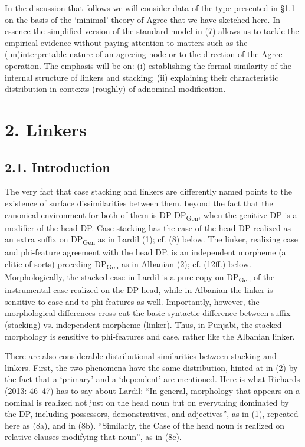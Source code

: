 \documentclass[output=paper]{langsci/langscibook}
\begin{document}
  In the discussion that follows we will consider data of the type presented in §1.1 on the basis of the ‘minimal’ theory of Agree that we have sketched here. In essence the simplified version of the standard model in (7) allows us to tackle the empirical evidence without paying attention to matters such as the (un)interpretable nature of an agreeing node or to the direction of the Agree operation. The emphasis will be on: (i) establishing the formal similarity of the internal structure of linkers and stacking; (ii) explaining their characteristic distribution in contexts (roughly) of adnominal modification.   

\section{ 2. Linkers} 

\subsection{ 2.1. Introduction}

The very fact that case stacking and linkers are differently named points to the existence of surface dissimilarities between them, beyond the fact that the canonical environment for both of them is DP DP\textsubscript{Gen}, when the genitive DP is a modifier of the head DP. Case stacking has the case of the head DP realized as an extra suffix on DP\textsubscript{Gen} as in Lardil (1); cf. (8) below. The linker, realizing case and phi-feature agreement with the head DP, is an independent morpheme (a clitic of sorts) preceding DP\textsubscript{Gen} as in Albanian (2); cf. (12ff.) below. Morphologically, the stacked case in Lardil is a pure copy on DP\textsubscript{Gen} of the instrumental case realized on the DP head, while in Albanian the linker is sensitive to case and to phi-features as well. Importantly, however, the morphological differences cross-cut the basic syntactic difference between suffix (stacking) vs. independent morpheme (linker). Thus, in Punjabi, the stacked morphology is sensitive to phi-features and case, rather like the Albanian linker.  

  There are also considerable distributional similarities between stacking and linkers. First, the two phenomena have the same distribution, hinted at in (2) by the fact that a ‘primary’ and a ‘dependent’ are mentioned. Here is what Richards (2013: 46–47) has to say about Lardil: “In general, morphology that appears on a nominal is realized not just on the head noun but on everything dominated by the DP, including possessors, demonstratives, and adjectives”, as in (1), repeated here as (8a), and in (8b). “Similarly, the Case of the head noun is realized on relative clauses modifying that noun”, as in (8c).  
\end{document}
